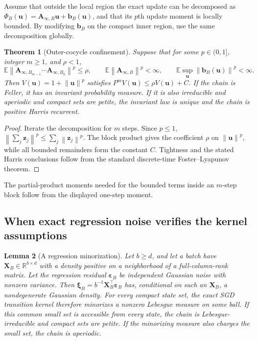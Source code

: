 \documentclass[10pt]{article}
\newtheorem{theorem}{Theorem}[section]
\newtheorem{lemma}[theorem]{Lemma}
\theoremstyle{definition}
\theoremstyle{remark}
\newcommand{\E}{\mathbb E}
\newcommand{\R}{\mathbb R}
\newcommand{\norm}[1]{\left\lVert#1\right\rVert}
\newcommand{\uvec}{\mathbf u}
\newcommand{\Avec}{\mathbf A}
\newcommand{\xivec}{\boldsymbol\xi}
\begin{document}
Assume that outside the local region the exact update can be decomposed as
$\Phi_B(\uvec)=\Avec_{\infty,B}\uvec+\mathbf b_B(\uvec)$, and that its
$p$th update moment is locally bounded.  By modifying $\mathbf b_B$ on the
compact inner region, use the same decomposition globally.

\begin{theorem}[Outer-cocycle confinement]
\label{thm:outer-drift}
Suppose that for some $p\in(0,1]$, integer $m\ge1$, and $\rho<1$,
\begin{equation}
 \E\norm{\Avec_{\infty,B_{m-1}}\cdots\Avec_{\infty,B_0}}^p\le\rho,
 \qquad
 \E\norm{\Avec_{\infty,B}}^p<\infty,
 \qquad
 \E\sup_{\uvec}\norm{\mathbf b_B(\uvec)}^p<\infty.
 \label{eq:outer-block}
\end{equation}
Then $V(\uvec)=1+\norm{\uvec}^p$ satisfies
$P^mV(\uvec)\le\rho V(\uvec)+C$.  If the chain is Feller, it has an
invariant probability measure.  If it is also irreducible and aperiodic and
compact sets are petite, the invariant law is unique and the chain is
positive Harris recurrent.
\end{theorem}

\begin{proof}
Iterate the decomposition for $m$ steps.  Since $p\le1$,
$\norm{\sum_j\mathbf z_j}^p\le\sum_j\norm{\mathbf z_j}^p$.  The block
product gives the coefficient $\rho$ on $\norm{\uvec}^p$, while all bounded
remainders form the constant $C$.  Tightness and the stated Harris conclusions
follow from the standard discrete-time Foster--Lyapunov theorem.
\end{proof}

The partial-product moments needed for the bounded terms inside an $m$-step
block follow from the displayed one-step moment.

\subsection{When exact regression noise verifies the kernel assumptions}

\begin{lemma}[A regression minorization]
\label{lem:regression-minorization}
Let $b\ge d$, and let a batch have $\mathbf X_B\in\R^{b\times d}$ with a
density positive on a neighborhood of a full-column-rank matrix.  Let the regression residual
$\boldsymbol\varepsilon_B$ be independent Gaussian noise with nonzero
variance.  Then
$\xivec_B=b^{-1}\mathbf X_B^\top\boldsymbol\varepsilon_B$ has, conditional
on such an $\mathbf X_B$, a nondegenerate Gaussian density.  For every compact
state set, the exact SGD transition kernel therefore minorizes a nonzero
Lebesgue measure on some ball.  If this common small set is accessible from
every state, the chain is Lebesgue-irreducible and compact sets are petite.
If the minorizing measure also charges the small set, the chain is aperiodic.
\end{lemma}
\end{document}
